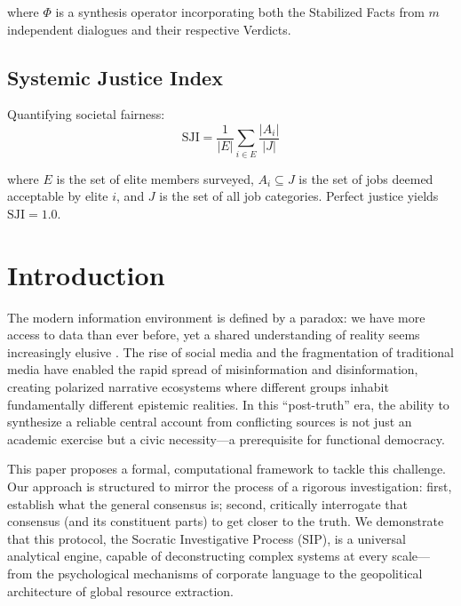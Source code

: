 \documentclass[11pt,a4paper]{article}
\begin{document}
where $\Phi$ is a synthesis operator incorporating both the Stabilized Facts from $m$ independent dialogues and their respective Verdicts.

\subsection*{Systemic Justice Index}
Quantifying societal fairness:
\begin{equation}
\text{SJI} = \frac{1}{|E|} \sum_{i \in E} \frac{|A_i|}{|J|}
\label{eq:sji}
\end{equation}

where $E$ is the set of elite members surveyed, $A_i \subseteq J$ is the set of jobs deemed acceptable by elite $i$, and $J$ is the set of all job categories. Perfect justice yields $\text{SJI} = 1.0$.

\vspace{0.5cm}
\clearpage
\setcounter{page}{1}


\section{Introduction}

The modern information environment is defined by a paradox: we have more access to data than ever before, yet a shared understanding of reality seems increasingly elusive \citep{Allcott2017}. The rise of social media and the fragmentation of traditional media have enabled the rapid spread of misinformation and disinformation, creating polarized narrative ecosystems where different groups inhabit fundamentally different epistemic realities. In this ``post-truth'' era, the ability to synthesize a reliable central account from conflicting sources is not just an academic exercise but a civic necessity---a prerequisite for functional democracy.

This paper proposes a formal, computational framework to tackle this challenge. Our approach is structured to mirror the process of a rigorous investigation: first, establish what the general consensus is; second, critically interrogate that consensus (and its constituent parts) to get closer to the truth. We demonstrate that this protocol, the Socratic Investigative Process (SIP), is a universal analytical engine, capable of deconstructing complex systems at every scale---from the psychological mechanisms of corporate language to the geopolitical architecture of global resource extraction.
\end{document}
